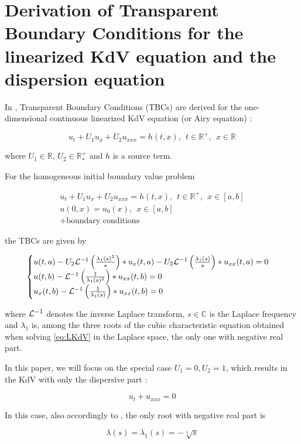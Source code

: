 \section{Derivation of Transparent Boundary Conditions for the linearized KdV equation and the dispersion equation}

\indent In \cite{besse2015}, Transparent Boundary Conditions (TBCs) are derived for the one-dimensional continuous linearized KdV equation (or Airy equation) :

\begin{equation}
 	\label{eq:LKdV}
 	u_t + U_1u_x + U_2u_{xxx} = h(t,x), \ \ t \in \mathbb{R}^+, \ \ x \in \mathbb{R}
\end{equation}

\noindent where $U_1 \in \mathbb{R}$, $U_2 \in \mathbb{R}^+_*$ and $h$ is a source term.

\indent For the homogeneous initial boundary value problem 

\begin{gather*}
	u_t + U_1u_x + U_2u_{xxx} = h(t,x), \ \ t \in \mathbb{R}^+, \ \ x \in [a,b] \\
	u(0,x) = u_0(x), \ \ x \in [a,b] \\
	+ \text{boundary conditions} \nonumber
\end{gather*}

\noindent the TBCs are given by 

\begin{equation}
\label{eq:continuousTBC}
\begin{cases}
        u(t,a) - U_2 \mathcal{L}^{-1} \left( \frac{\lambda_1(s)^2}{s} \right) * u_x(t,a) - U_2 \mathcal{L}^{-1} \left( \frac{\lambda_1(s)}{s} \right) * u_{xx}(t,a) = 0 \\ 
        u(t,b) - \mathcal{L}^{-1} \left( \frac{1}{\lambda_1(s)^2} \right) * u_{xx}(t,b) = 0 \\
        u_x(t,b) - \mathcal{L}^{-1} \left( \frac{1}{\lambda_1(s)} \right) * u_{xx}(t,b) = 0 
\end{cases}
\end{equation}

\noindent where $\mathcal{L}^{-1}$ denotes the inverse Laplace transform, $s \in \mathbb{C}$ is the Laplace frequency and $\lambda_1$ is, among the three roots of the cubic characteristic equation obtained when solving \eqref{eq:LKdV} in the Laplace space, the only one with negative real part.

\indent In this paper, we will focus on the special case $U_1 = 0, U_2 = 1$, which results in the KdV with only the dispersive part : 

\begin{equation}
	\label{eq:DKdV}
	u_t + u_{xxx} = 0
\end{equation}

\indent In this case, also accordingly to \cite{besse2015}, the only root with negative real part is 

\begin{equation}
	\label{eq:lambda}
			\lambda(s) = \lambda_1(s) =  -\sqrt[3]{s} 
\end{equation}